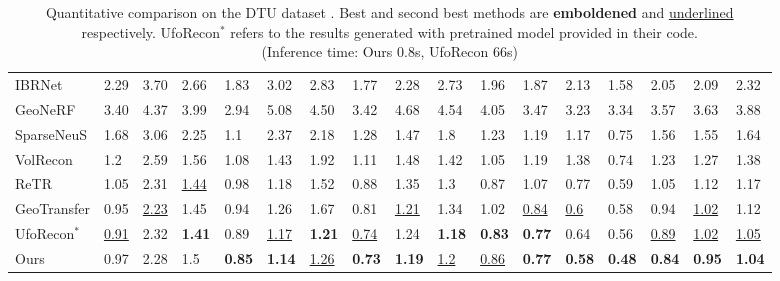\begin{table}[h]
{\begin{tabular}{llllllllllllllll|l}
\hline
IBRNet \cite{wang2021ibrnet} & 2.29 & 3.70 & 2.66 & 1.83 & 3.02 & 2.83 & 1.77 & 2.28 & 2.73 & 1.96 & 1.87 & 2.13 & 1.58 & 2.05 & 2.09 & 2.32 \\  
GeoNeRF \cite{johari2022geonerf} & 3.40 & 4.37 & 3.99 & 2.94 & 5.08 & 4.50 & 3.42 & 4.68 & 4.54 & 4.05 & 3.47 & 3.23 & 3.34 & 3.57 & 3.63 & 3.88 \\ 
SparseNeuS \cite{long2022sparseneus} & 1.68 & 3.06 & 2.25 & 1.1  & 2.37 & 2.18 & 1.28 & 1.47 & 1.8  & 1.23 & 1.19 & 1.17 & 0.75 & 1.56 & 1.55 & 1.64 \\ 
VolRecon \cite{ren2023volrecon} & 1.2  & 2.59 & 1.56 & 1.08 & 1.43 & 1.92 & 1.11 & 1.48 & 1.42 & 1.05 & 1.19 & 1.38 & 0.74 & 1.23 & 1.27 & 1.38 \\  
ReTR \cite{liang2024retr} & 1.05 & 2.31 & \underline{1.44} & 0.98 & 1.18 & 1.52 & 0.88 & 1.35 & 1.3  & 0.87 & 1.07 & 0.77 & 0.59 & 1.05 & 1.12 & 1.17 \\
GeoTransfer \cite{jena2024geotransfer} & 0.95 & \underline{2.23} & 1.45 & 0.94 & 1.26 & 1.67 & 0.81 & \underline{1.21} & 1.34 & 1.02 & \underline{0.84} & \underline{0.6} & 0.58 & 0.94 & \underline{1.02} & 1.12 \\ 
UfoRecon$^{\ast}$\footnotemark[1] \cite{ren2023volrecon} & \underline{0.91}  & 2.32 & \textbf{1.41} & 0.89 & \underline{1.17} & \textbf{1.21} & \underline{0.74} & 1.24 & \textbf{1.18} & \textbf{0.83} & \textbf{0.77} & 0.64 & 0.56 & \underline{0.89} & \underline{1.02} & \underline{1.05} \\  
\hline
Ours & 0.97 & 2.28 & 1.5 & \textbf{0.85} & \textbf{1.14} & \underline{1.26} & \textbf{0.73} & \textbf{1.19} & \underline{1.2} & \underline{0.86} & \textbf{0.77} & \textbf{0.58} & \textbf{0.48} & \textbf{0.84} & \textbf{0.95} & \textbf{1.04} \\  
\hline
\end{tabular}
}
\caption{Quantitative comparison on the DTU dataset \cite{aanaes2016large}. Best and second best methods are \textbf{emboldened} and \underline{underlined} respectively. UfoRecon$^{\ast}$ \cite{ren2023volrecon} refers to the results generated with pretrained model provided in their code.\\ (Inference time: Ours 0.8s, UfoRecon\cite{ren2023volrecon} 66s)} \label{tab:table1}
\vspace{-7pt}
\end{table}

